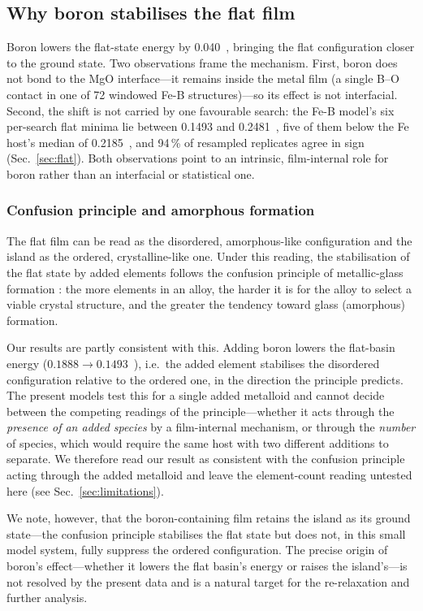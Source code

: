 \subsection{Why boron stabilises the flat film}
\label{sec:boron}

Boron lowers the flat-state energy by 0.040~\eVA, bringing the flat configuration closer to the
ground state. Two observations frame the mechanism. First, boron does not bond to the MgO
interface---it remains inside the metal film (a single B--O contact in one of 72 windowed Fe-B
structures)---so its effect is not interfacial. Second, the shift is not carried by one favourable
search: the Fe-B model's six per-search flat minima lie between 0.1493 and 0.2481~\eVA, five of them
below the Fe host's median of 0.2185~\eVA, and 94\,\% of resampled replicates agree in sign
(Sec.~\ref{sec:flat}). Both observations point to an intrinsic, film-internal role for boron rather
than an interfacial or statistical one.

\subsubsection{Confusion principle and amorphous formation} The flat film can be read as the disordered,
amorphous-like configuration and the island as the ordered, crystalline-like one. Under this reading,
the stabilisation of the flat state by added elements follows the confusion principle of
metallic-glass formation \cite{greer1993}: the more elements in an alloy, the harder it is for the
alloy to select a viable crystal structure, and the greater the tendency toward glass (amorphous)
formation.

Our results are partly consistent with this. Adding boron lowers the flat-basin energy
($0.1888 \to 0.1493$~\eVA), i.e.\ the added element stabilises the disordered configuration relative
to the ordered one, in the direction the principle predicts. The present models test this for a
single added metalloid and cannot decide between the competing readings of the principle---whether it
acts through the \emph{presence of an added species} by a film-internal mechanism, or through the
\emph{number} of species, which would require the same host with two different additions to separate.
We therefore read our result as consistent with the confusion principle acting through the added
metalloid and leave the element-count reading untested here (see Sec.~\ref{sec:limitations}).

We note, however, that the boron-containing film retains the island as its ground state---the
confusion principle stabilises the flat state but does not, in this small model system, fully
suppress the ordered configuration. The precise origin of boron's effect---whether it lowers the flat
basin's energy or raises the island's---is not resolved by the present data and is a natural target
for the re-relaxation and further analysis.

